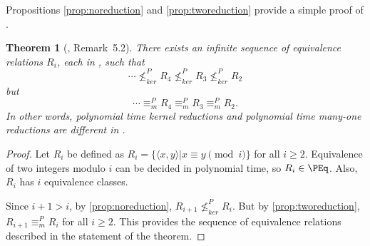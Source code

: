 \documentclass[draft]{article}
\newtheorem{theorem}{Theorem}[section]
\newtheorem{corollary}[corollary]{Corollary}
\theoremstyle{definition} \newtheorem{openproblem}[openproblem]{Open problem}
\theoremstyle{definition} \newtheorem{definition}[definition]{Definition}
\theoremstyle{remark} \newtheorem{remark}[remark]{Remark}
\newcommand{\nkr}{\nleq^{P}_{ker}} %
\newcommand{\kr}{\leq^{P}_{ker}} %
\newcommand{\moe}{\equiv^{P}_{m}} %
\newcommand{\pair}[2]{\langle#1,#2\rangle} %
\begin{document}
Propositions \ref{prop:noreduction} and \ref{prop:tworeduction} provide a simple proof of \cite[Remark~5.2]{bcffm}.

\begin{theorem}[\cite{bcffm}, Remark~5.2]
  There exists an infinite sequence of equivalence relations $R_i$, each in \PEq, such that
  \begin{displaymath}
    \cdots\nkr R_4\nkr R_3\nkr R_2
  \end{displaymath}
  but
  \begin{displaymath}
    \cdots\moe R_4\moe R_3\moe R_2.
  \end{displaymath}
  In other words, polynomial time kernel reductions and polynomial time many-one reductions are different in \PEq.
\end{theorem}
\begin{proof}
  Let $R_i$ be defined as $R_i=\{\pair{x}{y}|x\equiv y\pmod{i}\}$ for all $i\geq 2$.
  Equivalence of two integers modulo $i$ can be decided in polynomial time, so $R_i\in\PEq$.
  Also, $R_i$ has $i$ equivalence classes.

  Since $i+1>i$, by \autoref{prop:noreduction}, $R_{i+1}\nkr R_i$.
  But by \autoref{prop:tworeduction}, $R_{i+1}\moe R_i$ for all $i\geq 2$.
  This provides the sequence of equivalence relations described in the statement of the theorem.
\end{proof}

\end{document}

